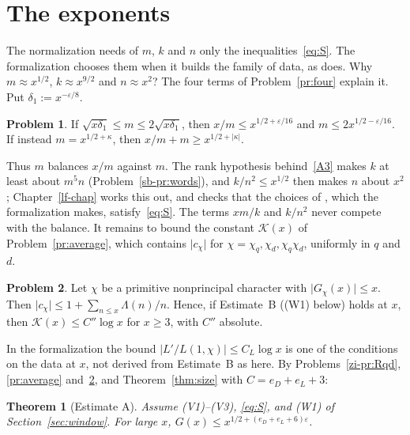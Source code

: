 \documentclass[reqno]{amsart}
\newcounter{chap}
\theoremstyle{definition}
\newtheorem{problem}{Problem}[section]
\theoremstyle{plain}
\newtheorem{theorem}{Theorem}[section]
\begin{document}
\section{The exponents}\label{sec:exponents}

The normalization needs of \(m\), \(k\) and \(n\) only the inequalities~\eqref{eq:S}.  The formalization chooses them when it builds the family of data, as \cite[Prop.~5.15]{Adr} does.  Why \(m \approx x^{1/2}\), \(k \approx x^{9/2}\) and \(n \approx x^2\)?  The four terms of Problem~\ref{pr:four} explain it.  Put \(\delta_1 := x^{-\varepsilon/8}\).

\begin{problem}\label{pr:m}
If \(\sqrt{x\delta_1} \le m \le 2\sqrt{x\delta_1}\), then \(x/m \le x^{1/2 + \varepsilon/16}\) and \(m \le 2x^{1/2 - \varepsilon/16}\).  If instead \(m = x^{1/2 + \kappa}\), then \(x/m + m \ge x^{1/2 + \lvert\kappa\rvert}\).
\end{problem}

Thus \(m\) balances \(x/m\) against \(m\).  The rank hypothesis behind~\eqref{A3} makes \(k\) at least about \(m^5n\) (Problem~\ref{sb-pr:words}), and \(k/n^2 \le x^{1/2}\) then makes \(n\) about \(x^2\); Chapter~\ref{lf-chap} works this out, and checks that the choices of \cite[Prop.~5.15]{Adr}, which the formalization makes, satisfy~\eqref{eq:S}.  The terms \(xm/k\) and \(k/n^2\) never compete with the balance.  It remains to bound the constant \(\mathcal{K}(x)\) of Problem~\ref{pr:average}, which contains \(\lvert c_\chi\rvert\) for \(\chi = \chi_q, \chi_d, \chi_q\chi_d\), uniformly in \(q\) and \(d\).

\begin{problem}\label{pr:cchi}
Let \(\chi\) be a primitive nonprincipal character with \(\lvert G_\chi(x)\rvert \le x\).  Then \(\lvert c_\chi\rvert \le 1 + \sum_{n \le x}\Lambda(n)/n\).  Hence, if Estimate~B ((W1) below) holds at \(x\), then \(\mathcal{K}(x) \le C''\log x\) for \(x \ge 3\), with \(C''\) absolute.
\end{problem}

In the formalization the bound \(\lvert L'/L(1,\chi)\rvert \le C_L\log x\) is one of the conditions on the data at \(x\), not derived from Estimate~B as here.  By Problems~\ref{zi-pr:Rqd}, \ref{pr:average} and~\ref{pr:cchi}, and Theorem~\ref{thm:size} with \(C = e_D + e_L + 3\):

\begin{theorem}[Estimate A]\label{thm:A}
Assume (V1)--(V3), \eqref{eq:S}, and (W1) of Section~\ref{sec:window}.  For large \(x\), \(G(x) \le x^{1/2 + (e_D + e_L + 6)\varepsilon}\).
\end{theorem}
\end{document}
